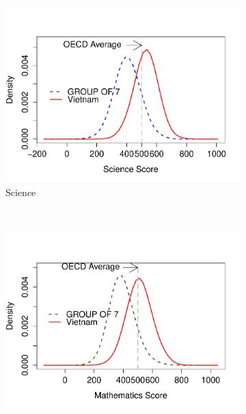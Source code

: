 \documentclass[12pt]{article}%
\begin{document}
\begin{figure}[H]
\caption{Kernel Density comparison between Vietnam and other Developing Countries}\label{fig:Kernel}
         \centering
         \begin{subfigure}[b]{0.3\textwidth}
                 \includegraphics[width=\textwidth]{INTRFIG2a.pdf}
                 \caption{Science}
                 \label{fig:science}
         \end{subfigure}%
         ~ %
         \begin{subfigure}[b]{0.3\textwidth}
                 \includegraphics[width=\textwidth]{INTRFIG2b.pdf}

\end{subfigure}
\end{figure}
\end{document}
